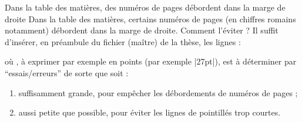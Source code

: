 \begin{dbfaq}{Dans la table des matières, des numéros de pages débordent dans
    la marge de droite}{}
  Dans la table des matières, certains numéros de pages (en chiffres romains
  notamment) débordent dans la marge de droite. Comment l'éviter ?
  \tcblower
  Il suffit d'insérer, en préambule du fichier (maître) de la thèse, les
  lignes :
\begin{preamblecode}[title=Par exemple dans le \File{\configurationfile}]
\makeatletter
\renewcommand*\@pnumwidth{"\meta{distance}"}
\makeatother
\end{preamblecode}
  où , à exprimer par exemple en points (par exemple |27pt|),
  est à déterminer par \enquote{essais/erreurs} de sorte que 
  soit :
  \begin{enumerate}
  \item suffisamment grande, pour empêcher les débordements de numéros de
    pages ;
  \item aussi petite que possible, pour éviter les lignes de pointillés trop
    courtes.
  \end{enumerate}
\end{dbfaq}

\subsection[Titres courants]{\texorpdfstring{}{Titres courants}}
\label{sec-titres-courants}

